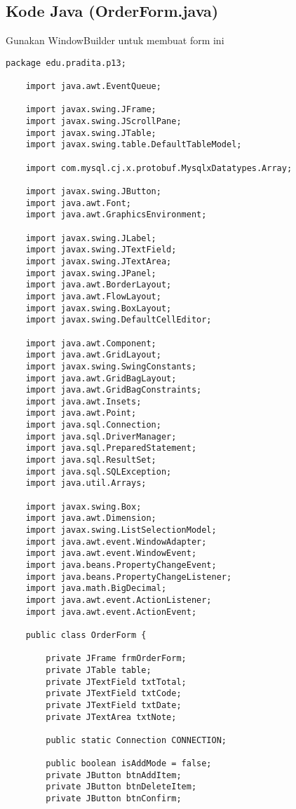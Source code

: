 \subsection{Kode Java (OrderForm.java)}

Gunakan WindowBuilder untuk membuat form ini

\begin{lstlisting}[style=JavaStyle]
	package edu.pradita.p13;
	
	import java.awt.EventQueue;
	
	import javax.swing.JFrame;
	import javax.swing.JScrollPane;
	import javax.swing.JTable;
	import javax.swing.table.DefaultTableModel;
	
	import com.mysql.cj.x.protobuf.MysqlxDatatypes.Array;
	
	import javax.swing.JButton;
	import java.awt.Font;
	import java.awt.GraphicsEnvironment;
	
	import javax.swing.JLabel;
	import javax.swing.JTextField;
	import javax.swing.JTextArea;
	import javax.swing.JPanel;
	import java.awt.BorderLayout;
	import java.awt.FlowLayout;
	import javax.swing.BoxLayout;
	import javax.swing.DefaultCellEditor;
	
	import java.awt.Component;
	import java.awt.GridLayout;
	import javax.swing.SwingConstants;
	import java.awt.GridBagLayout;
	import java.awt.GridBagConstraints;
	import java.awt.Insets;
	import java.awt.Point;
	import java.sql.Connection;
	import java.sql.DriverManager;
	import java.sql.PreparedStatement;
	import java.sql.ResultSet;
	import java.sql.SQLException;
	import java.util.Arrays;
	
	import javax.swing.Box;
	import java.awt.Dimension;
	import javax.swing.ListSelectionModel;
	import java.awt.event.WindowAdapter;
	import java.awt.event.WindowEvent;
	import java.beans.PropertyChangeEvent;
	import java.beans.PropertyChangeListener;
	import java.math.BigDecimal;
	import java.awt.event.ActionListener;
	import java.awt.event.ActionEvent;
	
	public class OrderForm {
		
		private JFrame frmOrderForm;
		private JTable table;
		private JTextField txtTotal;
		private JTextField txtCode;
		private JTextField txtDate;
		private JTextArea txtNote;
		
		public static Connection CONNECTION;
		
		public boolean isAddMode = false;
		private JButton btnAddItem;
		private JButton btnDeleteItem;
		private JButton btnConfirm;
		

\end{lstlisting}
